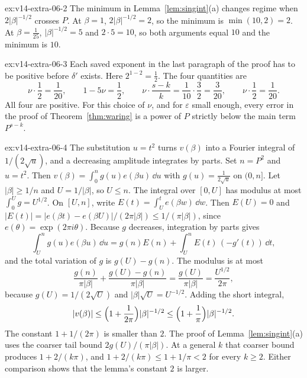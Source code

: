 \begin{solution}{ex:v14-extra-06-2}
\idea The minimum in Lemma~\ref{lem:singint}(a) changes regime when $2|\beta|^{-1/2}$ crosses $P$.
\writeup At $\beta=1$, $2|\beta|^{-1/2}=2$, so the minimum is $\min(10,2)=2$. At $\beta=\frac1{25}$, $|\beta|^{-1/2}=5$ and $2\cdot5=10$, so both arguments equal $10$ and the minimum is $10$.
\end{solution}

\begin{solution}{ex:v14-extra-06-3}
\idea Each saved exponent in the last paragraph of the proof has to be positive before $\delta'$ exists.
\writeup Here $2^{1-2}=\frac12$. The four quantities are
\[
\nu\cdot\frac12=\frac1{20},\qquad 1-5\nu=\frac12,\qquad \nu\cdot\frac{s-k}k=\frac1{10}\cdot\frac32=\frac3{20},\qquad \nu\cdot\frac12=\frac1{20}.
\]
All four are positive. For this choice of $\nu$, and for $\varepsilon$ small enough, every error in the proof of Theorem~\ref{thm:waring} is a power of $P$ strictly below the main term $P^{s-k}$.
\end{solution}

\begin{solution}{ex:v14-extra-06-4}
\idea The substitution $u=t^2$ turns $v(\beta)$ into a Fourier integral of $1/(2\sqrt u)$, and a decreasing amplitude integrates by parts.
\writeup Set $n=P^2$ and $u=t^2$. Then $v(\beta)=\int_0^n g(u)e(\beta u)\,\dd u$ with $g(u)=\frac1{2\sqrt u}$ on $(0,n]$. Let $|\beta|\ge1/n$ and $U=1/|\beta|$, so $U\le n$. The integral over $[0,U]$ has modulus at most $\int_0^U g=U^{1/2}$. On $[U,n]$, write $E(t)=\int_U^t e(\beta w)\,\dd w$. Then $E(U)=0$ and $|E(t)|=|e(\beta t)-e(\beta U)|/(2\pi|\beta|)\le1/(\pi|\beta|)$, since $e(\theta)=\exp(2\pi i\theta)$. Because $g$ decreases, integration by parts gives
\[
\int_U^n g(u)e(\beta u)\,\dd u=g(n)E(n)+\int_U^n E(t)\,(-g'(t))\,\dd t,
\]
and the total variation of $g$ is $g(U)-g(n)$. The modulus is at most
\[
\frac{g(n)}{\pi|\beta|}+\frac{g(U)-g(n)}{\pi|\beta|}=\frac{g(U)}{\pi|\beta|}=\frac{U^{1/2}}{2\pi},
\]
because $g(U)=1/(2\sqrt U)$ and $|\beta|\sqrt U=U^{-1/2}$. Adding the short integral,
\[
|v(\beta)|\le\Bigl(1+\frac1{2\pi}\Bigr)|\beta|^{-1/2}\le\Bigl(1+\frac1\pi\Bigr)|\beta|^{-1/2}.
\]
The constant $1+1/(2\pi)$ is smaller than $2$. The proof of Lemma~\ref{lem:singint}(a) uses the coarser tail bound $2g(U)/(\pi|\beta|)$. At a general $k$ that coarser bound produces $1+2/(k\pi)$, and $1+2/(k\pi)\le1+1/\pi<2$ for every $k\ge2$. Either comparison shows that the lemma's constant $2$ is larger.
\end{solution}

